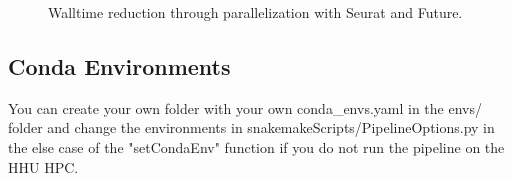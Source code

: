 \begin{figure}[h!]
	\centering
	\caption{Walltime reduction through parallelization with Seurat and Future.}
	\label{fig:parallelBars}
\end{figure}

\subsection{Conda Environments}
You can create your own folder with your own conda\_envs.yaml in the envs/ folder and change the environments in snakemakeScripts/PipelineOptions.py in the else case of the "setCondaEnv" function if you do not run the pipeline on the HHU HPC.
